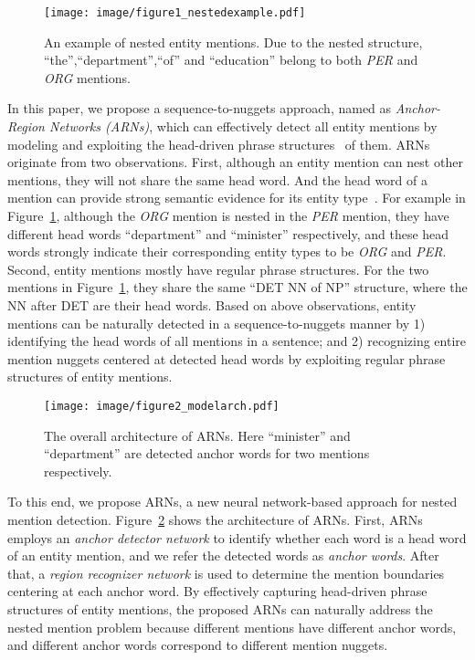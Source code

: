 \documentclass[11pt,a4paper]{article}
\begin{document}
\begin{figure}
  \setlength{\belowcaptionskip}{-0.4cm}
  \centering
  \texttt{[image: image/figure1\_nestedexample.pdf]}\\
  \caption{An example of nested entity mentions. Due to the nested structure, ``the'',``department'',``of'' and ``education'' belong to both \emph{PER} and \emph{ORG} mentions.}
  \label{fig:exp_nested_mention}
\end{figure}


In this paper, we propose a sequence-to-nuggets approach, named as \emph{Anchor-Region Networks (ARNs)}, which can effectively detect all entity mentions by modeling and exploiting the head-driven phrase structures~\cite{pollard1994head,collins2003head} of them. ARNs originate from two observations. First, although an entity mention can nest other mentions, they will not share the same head word. And the head word of a mention can provide strong semantic evidence for its entity type~\cite{P18-1009}. For example in Figure~\ref{fig:exp_nested_mention}, although the \emph{ORG} mention is nested in the \emph{PER} mention, they have different head words ``department'' and ``minister'' respectively, and these head words strongly indicate their corresponding entity types to be \emph{ORG} and \emph{PER}. Second, entity mentions mostly have regular phrase structures. For the two mentions in Figure~\ref{fig:exp_nested_mention}, they share the same ``DET NN of NP'' structure, where the NN after DET are their head words. Based on above observations, entity mentions can be naturally detected in a sequence-to-nuggets manner by 1) identifying the head words of all mentions in a sentence; and 2) recognizing entire mention nuggets centered at detected head words by exploiting regular phrase structures of entity mentions.

\begin{figure}[t]
\setlength{\belowcaptionskip}{-0.5cm}
  \centering
  \texttt{[image: image/figure2\_modelarch.pdf]}\\
  \caption{The overall architecture of ARNs. Here ``minister'' and ``department'' are detected anchor words for two mentions respectively.}\label{fig:model_archi}
\end{figure}

To this end, we propose ARNs, a new neural network-based approach for nested mention detection. Figure~\ref{fig:model_archi} shows the architecture of ARNs. First, ARNs employs an \emph{anchor detector network} to identify whether each word is a head word of an entity mention, and we refer the detected words as \emph{anchor words}. After that, a \emph{region recognizer network} is used to determine the mention boundaries centering at each anchor word. By effectively capturing head-driven phrase structures of entity mentions, the proposed ARNs can naturally address the nested mention problem because different mentions have different anchor words, and different anchor words correspond to different mention nuggets.
\end{document}
